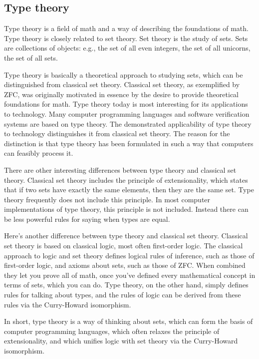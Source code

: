 \documentclass{article}
\begin{document}
\subsection{Type theory}

Type theory is a field of math and a way of describing the foundations of math. Type theory is closely related to set theory. Set theory is the study of sets. Sets are collections of objects: e.g., the set of all even integers, the set of all unicorns, the set of all sets.

Type theory is basically a theoretical approach to studying sets, which can be distinguished from classical set theory. Classical set theory, as exemplified by ZFC, was originally motivated in essence by the desire to provide theoretical foundations for math. Type theory today is most interesting for its applications to technology. Many computer programming languages and software verification systems are based on type theory. The demonstrated applicability of type theory to technology distinguishes it from classical set theory. The reason for the distinction is that type theory has been formulated in such a way that computers can feasibly process it.

There are other interesting differences between type theory and classical set theory. Classical set theory includes the principle of extensionality, which states that if two sets have exactly the same elements, then they are the same set. Type theory frequently does not include this principle. In most computer implementations of type theory, this principle is not included. Instead there can be less powerful rules for saying when types are equal.

Here’s another difference between type theory and classical set theory. Classical set theory is based on classical logic, most often first-order logic. The classical approach to logic and set theory defines logical rules of inference, such as those of first-order logic, and axioms about sets, such as those of ZFC. When combined they let you prove all of math, once you've defined every mathematical concept in terms of sets, which you can do. Type theory, on the other hand, simply defines rules for talking about types, and the rules of logic can be derived from these rules via the Curry-Howard isomorphism.

In short, type theory is a way of thinking about sets, which can form the basis of computer programming languages, which often relaxes the principle of extensionality, and which unifies logic with set theory via the Curry-Howard isomorphism.
\end{document}
